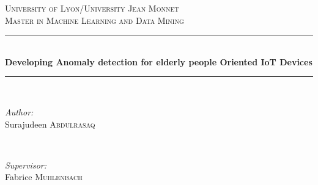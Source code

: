 \documentclass[a4paper, parskip=full]{scrartcl}
\date{}
\begin{document}
	

\begin{titlepage}
	
	\newcommand{\HRule}{\rule{\linewidth}{0.5mm}} %
	
	\center %
	
	
	\textsc{\LARGE University of Lyon/University Jean Monnet}\\[1.5cm] %
	\textsc{\Large Master in Machine Learning and Data Mining}\\[0.5cm] %
	
	
	\HRule \\[0.4cm]
	{ \huge \bfseries Developing Anomaly detection for elderly people Oriented IoT Devices}\\[0.4cm] %
	\HRule \\[1.5cm]
	
	
	\begin{minipage}{0.4\textwidth}
		\begin{flushleft} \large
			\emph{Author:}\\
			Surajudeen \textsc{Abdulrasaq} %
		\end{flushleft}
	\end{minipage}
	~
	\begin{minipage}{0.4\textwidth}
		\begin{flushright} \large
			\emph{Supervisor:} \\
			Fabrice  \textsc{Muhlenbach} %
		\end{flushright}
	\end{minipage}\\[2cm]
	

\end{titlepage}
\end{document}

